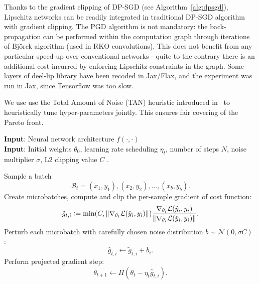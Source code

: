     Thanks to the gradient clipping of DP-SGD (see Algorithm~\ref{alg:dpsgd}), Lipschitz networks can be readily integrated in traditional DP-SGD algorithm with gradient clipping. The PGD algorithm is not mandatory: the back-propagation can be performed within the computation graph through iterations of Bj\"orck algorithm (used in RKO convolutions). This does not benefit from any particular speed-up over conventional networks - quite to the contrary there is an additional cost incurred by enforcing Lipschitz constraints in the graph. Some layers of deel-lip library have been recoded in Jax/Flax, and the experiment was run in Jax, since Tensorflow was too slow. 

    We use use the Total Amount of Noise (TAN) heuristic introduced in~\cite{sander2022tan} to heuristically tune hyper-parameters jointly. This ensures fair covering of the Pareto front.
    
    \begin{algorithm}%
    \caption{Differentially Private Stochastic Gradient Descent : \textbf{DP-SGD}}
    \label{alg:dpsgd}
    \textbf{Input}: Neural network architecture $f(\cdot,\cdot)$\\
    \textbf{Input}: Initial weights $\theta_0$, learning rate scheduling $\eta_t$, number of steps $N$, noise multiplier $\sigma$, L2 clipping value $C$ .\\
    \begin{algorithmic}[1] %
    \Repeat
        \State Sample a batch 
        $$\mathcal{B}_t = {(x_1, y_1), (x_2, y_2), \ldots , (x_b, y_b)}.$$
        \State Create microbatches, compute and clip the per-sample gradient of cost function:
            $$\tilde g_{t,i}\vcentcolon= \min(C,\|\nabla_{\theta_t} \mathcal{L} (\hat y_i,y_i)\|) \frac{\nabla_{\theta_t}\mathcal{L} (\hat y_i,y_i)}{\|\nabla_{\theta_t} \mathcal{L} (\hat y_i,y_i)\|}.$$
        \State Perturb each microbatch with carefully chosen noise distribution $b \sim \mathcal{N}(0,\sigma C)$ :
            $$\hat g_{t,i}\gets \tilde g_{t,i} + b_i.$$
        \State Perform projected gradient step:
            $$\theta_{t+1}\gets \Pi(\theta_t-\eta_t \hat g_{t,i}).$$
        \EndFor
    \end{algorithmic}
    \end{algorithm}

